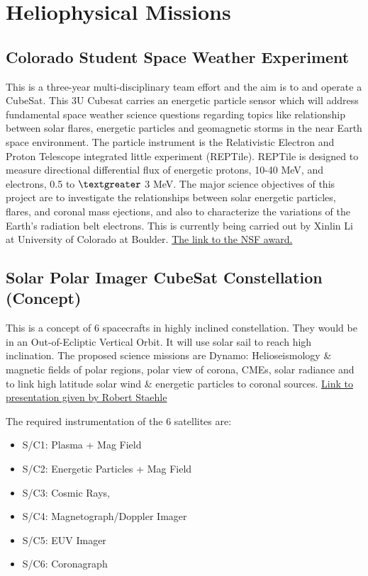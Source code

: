 \section{Heliophysical Missions}

\subsection{Colorado Student Space Weather Experiment}

This is a three-year multi-disciplinary team effort and the aim is to and operate a CubeSat. This 3U Cubesat carries an energetic particle sensor which will address fundamental space weather science questions regarding topics like relationship between solar flares, energetic particles and geomagnetic storms in the near Earth space environment. The particle instrument is the Relativistic Electron and Proton Telescope integrated little experiment (REPTile). REPTile is designed to measure directional differential flux of energetic protons, 10-40 MeV, and electrons, 0.5 to $\textgreater$ 3 MeV.  The major science objectives of this project are to investigate the relationships between solar energetic particles, flares, and coronal mass ejections, and also to characterize the variations of the Earth's radiation belt electrons. This is currently being carried out by Xinlin Li at University of Colorado at Boulder. \href{http://nsf.gov/awardsearch/showAward?AWD_ID=1042815&HistoricalAwards=false}{The link to the NSF award.}

\subsection{Solar Polar Imager CubeSat Constellation (Concept)}
This is a concept of 6 spacecrafts in highly inclined constellation. They would be in an Out-of-Ecliptic Vertical Orbit. It will use solar sail to reach high inclination. The proposed science missions are Dynamo: Helioseismology \& magnetic fields of polar regions,
polar view of corona, CMEs, solar radiance and to link high latitude solar wind \& energetic particles to coronal sources.  \href{http://kiss.caltech.edu/cosponsored/cubesat2012/presentations/staehle-interplanetary-cubesat-missions.pdf}{Link to presentation given by Robert Staehle}

The required instrumentation of the 6  satellites are:
\begin{itemize}
\item S/C1: Plasma + Mag Field 
\item S/C2: Energetic Particles + Mag Field 
\item S/C3: Cosmic Rays, 
\item S/C4: Magnetograph/Doppler Imager 
\item S/C5: EUV Imager 
\item S/C6: Coronagraph 
\end{itemize}


